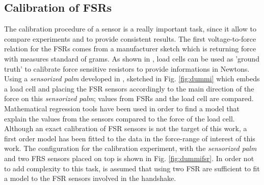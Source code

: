 \subsection{Calibration of FSRs}
The calibration procedure of a sensor is a really important task, since it allow to compare experiments and to provide consistent results. 
The first voltage-to-force relation for the FSRs comes from a manufacturer sketch which is returning force with measures standard of grams.
As shown in \cite{calibFSR}, load cells can be used as 'ground truth' to calibrate force sensitive resistors to provide informations in Newtons. 
Using a \textit{sensorized palm} developed in \cite{espen}, sketched in Fig. \ref{fig:dummi} which embeds a load cell and placing the FSR sensors accordingly to the main direction of the force on this \textit{sensorized palm}; values from FSRs and the load cell are compared.
Mathematical regression tools have been used in order to find a model that explain the values from the sensors compared to the force of the load cell.
Although an exact calibration of FSR sensors is not the target of this work, a first order model has been fitted to the data in the force-range of interest of this work.
The configuration for the calibration experiment, with the \textit{sensorized palm} and two FRS sensors placed on top is shown in Fig. \ref{fig:dummifsr}. In order not to add complexity to this task, is assumed that using two FSR are sufficient to fit a model to the FSR sensors involved in the handshake.

